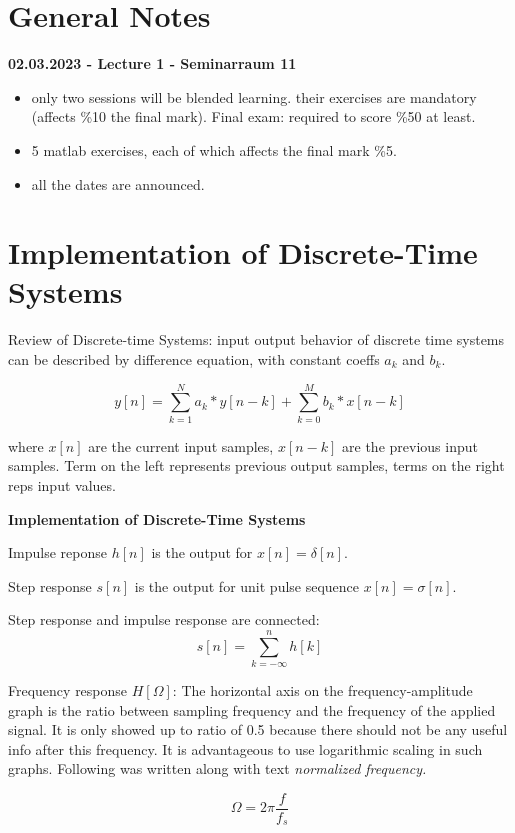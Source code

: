 \section{General Notes}
\textbf{02.03.2023 - Lecture 1 - Seminarraum 11}\\

\begin{itemize}
	\item 	only two sessions will be blended learning. their exercises are mandatory (affects \%10 the final mark). Final exam: required to score \%50 at least.

	\item 5 matlab exercises, each of which affects the final mark \%5.

	\item all the dates are announced.
\end{itemize}

\section{Implementation of Discrete-Time Systems}

Review of Discrete-time Systems: input output behavior of discrete time systems can be described by difference equation, with constant coeffs $a_k$ and $b_k$.

$$
y[n] = \sum_{k=1}^{N} a_k*y[n-k] + \sum_{k=0}^{M} b_k*x[n-k]
$$

where $x[n]$ are the current input samples, $x[n-k]$ are the previous input samples. Term on the left represents previous output samples, terms on the right reps input values.

\textbf{Implementation of Discrete-Time Systems}

Impulse reponse $h[n]$ is the output for $x[n] = \delta[n]$.

Step response $s[n]$ is the output for unit pulse sequence $x[n] = \sigma[n]$.

Step response and impulse response are connected: $$ s[n] = \sum_{k=-\infty}^{n}h[k]$$

Frequency response $H[\Omega]$: The horizontal axis on the frequency-amplitude graph is the ratio between sampling frequency and the frequency of the applied signal. It is only showed up to ratio of 0.5 because there should not be any useful info after this frequency. It is advantageous to use logarithmic scaling in such graphs. Following was written along with text \textit{normalized frequency.}

$$\Omega = 2\pi \frac{f}{f_s}$$

